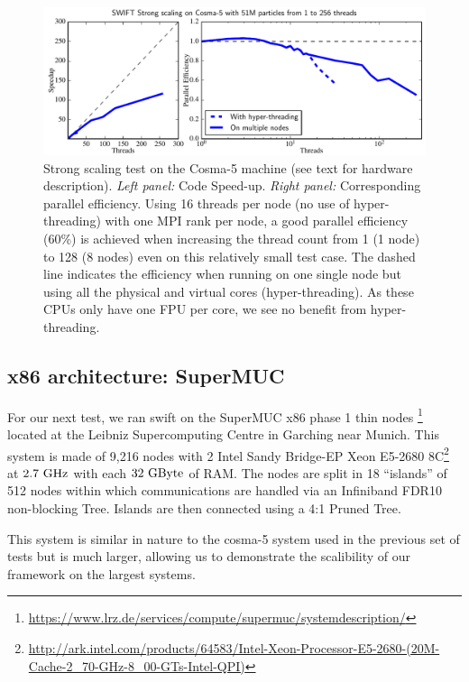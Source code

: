 \documentclass{sig-alternate-05-2015}
\newcommand{\swift}{{\sc swift}\xspace}
\begin{document}
\begin{figure}
\centering
\includegraphics[width=\textwidth]{Figures/scalingCosma}
\caption{Strong scaling test on the Cosma-5 machine (see text for hardware
  description). \textit{Left panel:} Code Speed-up. \textit{Right panel:}
  Corresponding parallel efficiency.  Using 16 threads per node (no use of
  hyper-threading) with one MPI rank per node, a good parallel efficiency (60\%)
  is achieved when increasing the thread count from 1 (1 node) to 128 (8 nodes)
  even on this relatively small test case. The dashed line indicates the
  efficiency when running on one single node but using all the physical and
  virtual cores (hyper-threading). As these CPUs only have one FPU per core, we
  see no benefit from hyper-threading.
  \label{fig:cosma}}
\end{figure}



\subsection{x86 architecture: SuperMUC}

For our next test, we ran \swift on the SuperMUC x86 phase 1 thin
nodes \footnote{\url{https://www.lrz.de/services/compute/supermuc/systemdescription/}}
located at the Leibniz Supercomputing Centre in Garching near Munich. This
system is made of 9,216 nodes with 2 Intel Sandy Bridge-EP Xeon E5-2680
8C\footnote{\url{http://ark.intel.com/products/64583/Intel-Xeon-Processor-E5-2680-(20M-Cache-2_70-GHz-8_00-GTs-Intel-QPI)}}
at $2.7~\rm{GHz}$ with each $32~\rm{GByte}$ of RAM. The nodes are split in 18
``islands'' of 512 nodes within which communications are handled via an
Infiniband FDR10 non-blocking Tree. Islands are then connected using a 4:1
Pruned Tree.

This system is similar in nature to the cosma-5 system used in the previous set
of tests but is much larger, allowing us to demonstrate the scalibility of our
framework on the largest systems.
\end{document}
